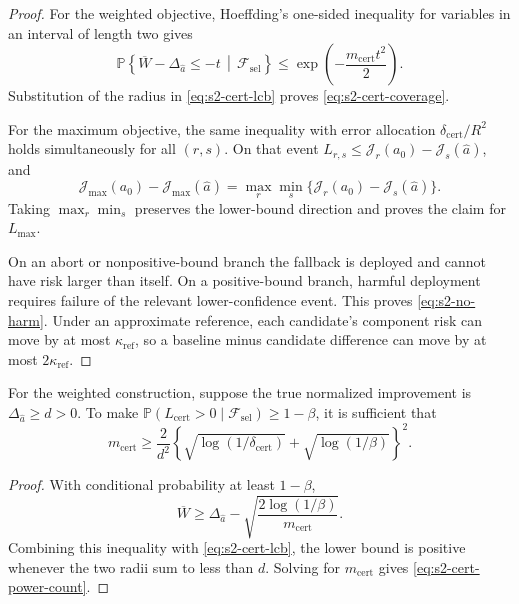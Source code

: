 \begin{proof}
For the weighted objective, Hoeffding's one-sided inequality for variables in
an interval of length two gives
\[
 \mathbb P\left\{
  \overline W-\Delta_{\widehat a}\leq-t
  \,\middle|\,\mathcal F_{\mathrm{sel}}
 \right\}
 \leq
 \exp\left(-\frac{m_{\mathrm{cert}}t^2}{2}\right).
\]
Substitution of the radius in \eqref{eq:s2-cert-lcb} proves
\eqref{eq:s2-cert-coverage}.

For the maximum objective, the same inequality with error allocation
\(\delta_{\mathrm{cert}}/R^2\) holds simultaneously for all \((r,s)\).
On that event \(L_{r,s}\leq\mathcal J_r(a_0)-\mathcal J_s(\widehat a)\), and
\[
 \mathcal J_{\max}(a_0)-\mathcal J_{\max}(\widehat a)
 =
 \max_r\min_s
 \{\mathcal J_r(a_0)-\mathcal J_s(\widehat a)\}.
\]
Taking \(\max_r\min_s\) preserves the lower-bound direction and proves the
claim for \(L_{\max}\).

On an abort or nonpositive-bound branch the fallback is deployed and cannot
have risk larger than itself.  On a positive-bound branch, harmful deployment
requires failure of the relevant lower-confidence event.  This proves
\eqref{eq:s2-no-harm}.  Under an approximate reference, each candidate's
component risk can move by at most \(\kappa_{\mathrm{ref}}\), so a baseline
minus candidate difference can move by at most
\(2\kappa_{\mathrm{ref}}\).
\end{proof}

\begin{proposition}
\label{prop:s2-cert-power}
For the weighted construction, suppose the true normalized improvement is
\(\Delta_{\widehat a}\geq d>0\).  To make
\(\mathbb P(L_{\mathrm{cert}}>0\mid\mathcal F_{\mathrm{sel}})
\geq1-\beta\), it is sufficient that
\begin{equation}
 m_{\mathrm{cert}}
 \geq
 \frac{2}{d^2}
 \left\{
  \sqrt{\log(1/\delta_{\mathrm{cert}})}
  +
  \sqrt{\log(1/\beta)}
 \right\}^2.
 \label{eq:s2-cert-power-count}
\end{equation}
\end{proposition}

\begin{proof}
With conditional probability at least \(1-\beta\),
\[
 \overline W
 \geq
 \Delta_{\widehat a}
 -
 \sqrt{\frac{2\log(1/\beta)}{m_{\mathrm{cert}}}}.
\]
Combining this inequality with \eqref{eq:s2-cert-lcb}, the lower bound is
positive whenever the two radii sum to less than \(d\).
Solving for \(m_{\mathrm{cert}}\) gives
\eqref{eq:s2-cert-power-count}.
\end{proof}

